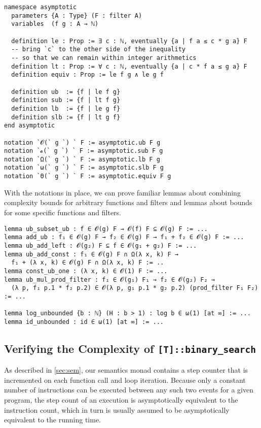 \begin{verbatim}
namespace asymptotic
  parameters {A : Type} (F : filter A)
  variables  (f g : A → ℕ)

  definition le : Prop := ∃ c : ℕ, eventually {a | f a ≤ c * g a} F
  -- bring `c` to the other side of the inequality
  -- so that we can remain within integer arithmetics
  definition lt : Prop := ∀ c : ℕ, eventually {a | c * f a ≤ g a} F
  definition equiv : Prop := le f g ∧ le g f

  definition ub  := {f | le f g}
  definition sub := {f | lt f g}
  definition lb  := {f | le g f}
  definition slb := {f | lt g f}
end asymptotic

notation `𝓞(` g `) ` F := asymptotic.ub F g
notation `𝓸(` g `) ` F := asymptotic.sub F g
notation `Ω(` g `) ` F := asymptotic.lb F g
notation `ω(` g `) ` F := asymptotic.slb F g
notation `Θ(` g `) ` F := asymptotic.equiv F g
\end{verbatim}

With the notations in place, we can prove familiar lemmas about combining
complexity bounds for arbitrary functions and filters and lemmas about bounds for some
specific functions and filters.

\begin{verbatim}
lemma ub_subset_ub : f ∈ 𝓞(g) F → 𝓞(f) F ⊆ 𝓞(g) F := ...
lemma add_ub : f₁ ∈ 𝓞(g) F → f₂ ∈ 𝓞(g) F → f₁ + f₂ ∈ 𝓞(g) F := ...
lemma ub_add_left : 𝓞(g₂) F ⊆ f ∈ 𝓞(g₁ + g₂) F := ...
lemma ub_add_const : f₁ ∈ 𝓞(g) F ∩ Ω(λ x, k) F →
  f₁ + (λ x, k) ∈ 𝓞(g) F ∩ Ω(λ x, k) F := ..
lemma const_ub_one : (λ x, k) ∈ 𝓞(1) F := ...
lemma ub_mul_prod_filter : f₁ ∈ 𝓞(g₁) F₁ → f₂ ∈ 𝓞(g₂) F₂ →
  (λ p, f₁ p.1 * f₂ p.2) ∈ 𝓞(λ p, g₁ p.1 * g₂ p.2) (prod_filter F₁ F₂) := ...

lemma log_unbounded {b : ℕ} (H : b > 1) : log b ∈ ω(1) [at ∞] := ...
lemma id_unbounded : id ∈ ω(1) [at ∞] := ...
\end{verbatim}

\subsection{Verifying the Complexity of \texttt{[T]::binary\_search}}

As described in \autoref{sec:sem}, our semantics monad contains a step counter
that is incremented on each function call and loop iteration. Because only a
constant number of instructions can be executed between any such two events for
a given program, the step count of an execution is asymptotically equivalent to the instruction
count, which in turn is usually assumed to be asymptotically equivalent to the running time.

